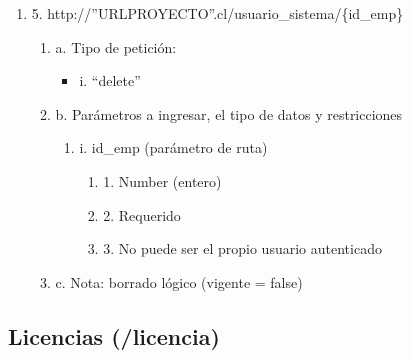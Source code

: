 \begin{enumerate}
    \item 5. http://”URLPROYECTO”.cl/usuario\_sistema/\{id\_emp\}
    \begin{enumerate}
        \item a. Tipo de petición:
            \begin{itemize}
               \item i. “delete”
            \end{itemize}
        \item b. Parámetros a ingresar, el tipo de datos y restricciones
            \begin{enumerate}
                \item i. id\_emp (parámetro de ruta)
                    \begin{enumerate}
                        \item 1. Number (entero)
                        \item 2. Requerido
                        \item 3. No puede ser el propio usuario autenticado
                    \end{enumerate}
            \end{enumerate}
        \item c. Nota: borrado lógico (vigente = false)
    \end{enumerate}
\end{enumerate}

\subsection{Licencias (/licencia)}

